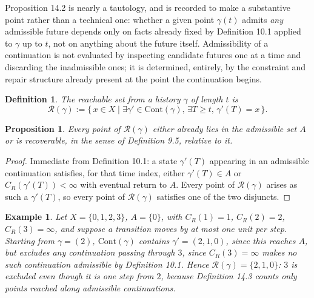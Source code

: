 \documentclass[11pt]{book}
\newtheorem{definition}[theorem]{Definition}
\newtheorem{proposition}[theorem]{Proposition}
\newtheorem{example}[theorem]{Example}
\begin{document}
Proposition 14.2 is nearly a tautology, and is recorded to make a substantive point rather than a technical one: whether a given point $\gamma(t)$ admits \emph{any} admissible future depends only on facts already fixed by Definition 10.1 applied to $\gamma$ up to $t$, not on anything about the future itself. Admissibility of a continuation is not evaluated by inspecting candidate futures one at a time and discarding the inadmissible ones; it is determined, entirely, by the constraint and repair structure already present at the point the continuation begins.

\begin{definition}
The \emph{reachable set} from a history $\gamma$ of length $t$ is
\[
\mathcal R(\gamma) := \{\, x \in X \mid \exists \gamma' \in \mathrm{Cont}(\gamma), \, \exists T \geq t, \, \gamma'(T) = x \,\}.
\]
\end{definition}

\begin{proposition}
Every point of $\mathcal R(\gamma)$ either already lies in the admissible set $A$ or is recoverable, in the sense of Definition 9.5, relative to it.
\end{proposition}

\begin{proof}
Immediate from Definition 10.1: a state $\gamma'(T)$ appearing in an admissible continuation satisfies, for that time index, either $\gamma'(T) \in A$ or $C_R(\gamma'(T)) < \infty$ with eventual return to $A$. Every point of $\mathcal R(\gamma)$ arises as such a $\gamma'(T)$, so every point of $\mathcal R(\gamma)$ satisfies one of the two disjuncts.
\end{proof}

\begin{example}
Let $X = \{0,1,2,3\}$, $A = \{0\}$, with $C_R(1)=1$, $C_R(2)=2$, $C_R(3)=\infty$, and suppose a transition moves by at most one unit per step. Starting from $\gamma = (2)$, $\mathrm{Cont}(\gamma)$ contains $\gamma' = (2,1,0)$, since this reaches $A$, but excludes any continuation passing through $3$, since $C_R(3)=\infty$ makes no such continuation admissible by Definition 10.1. Hence $\mathcal R(\gamma) = \{2,1,0\}$: $3$ is excluded even though it is one step from $2$, because Definition 14.3 counts only points reached along \emph{admissible} continuations.
\end{example}
\end{document}
